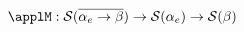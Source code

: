 \documentclass[preview]{standalone}
\begin{document}
\begin{equation*}
  \applM : \mathcal{S}(\wrapdf{\alpha_e \rightarrow \beta}) \rightarrow \mathcal{S}(\alpha_e) \rightarrow \mathcal{S}(\beta)
\end{equation*}
\end{document}
